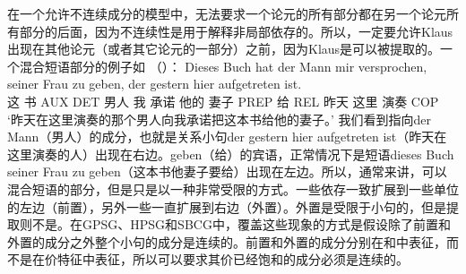 在一个允许不连续成分的模型中，无法要求一个论元的所有部分都在另一个论元所有部分的后面，因为不连续性是用于解释非局部依存的。所以，一定要允许Klaus出现在其他论元（或者其它论元的一部分）之前，因为Klaus是可以被提取的。一个混合短语部分的例子如 （）：
\ea
\gll Dieses Buch hat der Mann mir versprochen, seiner Frau zu geben, der gestern hier aufgetreten ist.\\
     这   书 AUX DET 男人  我  承诺     他的    妻子 PREP 给   REL 昨天 这里 演奏 COP\\
\glt `昨天在这里演奏的那个男人向我承诺把这本书给他的妻子。'
\z 
我们看到指向der Mann（男人）的成分，也就是关系小句der gestern hier aufgetreten ist（昨天在这里演奏的人）出现在右边。geben（给）的宾语，正常情况下是短语dieses Buch seiner Frau zu geben（这本书他妻子要给）出现在左边。所以，通常来讲，可以混合短语的部分，但是只是以一种非常受限的方式。一些依存一致扩展到一些单位的左边（前置），另外一些一直扩展到右边（外置）。外置是受限于小句的，但是提取则不是。在GPSG、HPSG和SBCG中，覆盖这些现象的方式是假设除了前置和外置的成分之外整个小句的成分是连续的。前置和外置的成分分别在\slaschc 和\extrac\citep{Keller95b,Mueller99a}中表征，而不是在价特征中表征，所以可以要求其价已经饱和的成分必须是连续的。

